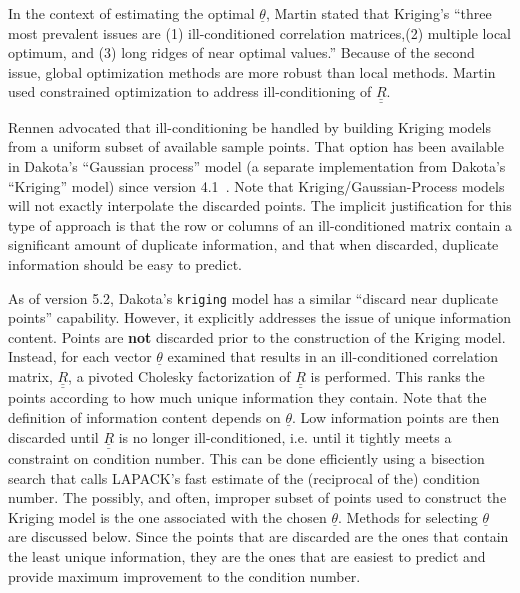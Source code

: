In the context of estimating the optimal $\underline{\theta}$,
Martin \cite{Mar09} stated that Kriging's
``three most prevalent issues are (1) ill-conditioned correlation 
matrices,(2) multiple local optimum, and (3) long ridges of near 
optimal values.'' Because of the second issue, global optimization 
methods are more robust than local methods.  Martin used constrained 
optimization to address ill-conditioning of $\underline{\underline{R}}$.
\newline

Rennen \cite{Ren09} advocated that ill-conditioning
be handled by building Kriging models from a uniform subset of 
available sample points.  That option has been available in
Dakota's ``Gaussian process'' model (a separate implementation 
from Dakota's ``Kriging'' model) since version 4.1~\cite{UserMan4_1}. 
Note that Kriging/Gaussian-Process models 
will not exactly interpolate the discarded points.  The implicit 
justification for this type of approach is that the row or columns of 
an ill-conditioned matrix contain a significant amount of duplicate 
information, and that when discarded, duplicate information should be 
easy to predict.\newline  

As of version 5.2, Dakota's \texttt{kriging} model has a similar 
``discard near duplicate points'' capability.  However, it explicitly
addresses the issue of unique information content.  Points are {\bf not} 
discarded prior to the construction of the Kriging model.  Instead,
for each vector $\underline{\theta}$ examined that results in an 
ill-conditioned correlation matrix, $\underline{\underline{R}}$,
a pivoted Cholesky factorization of $\underline{\underline{R}}$ is 
performed.  This ranks the points according to how much unique 
information they contain.  Note that the definition of information
content depends on $\underline{\theta}$.  Low information points are 
then discarded until $\underline{\underline{R}}$ is no longer 
ill-conditioned, i.e. until it tightly meets a constraint on 
condition number.  This can be done efficiently using a bisection 
search that calls LAPACK's fast estimate of the (reciprocal of the) 
condition number.  The possibly, and often, improper subset of points 
used to construct the Kriging model is the one associated with the 
chosen $\underline{\theta}$.  Methods for selecting $\underline{\theta}$ 
are discussed below.  Since the points that are discarded are the ones 
that contain the least unique information, they are the ones that are 
easiest to predict and provide maximum improvement to the condition number.
\newline

